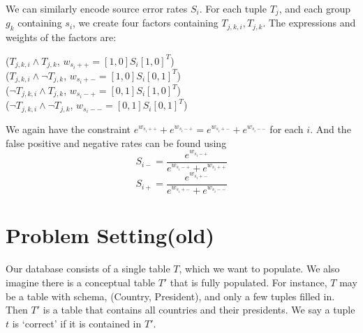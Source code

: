 \documentclass{sig-alternate}
\newcounter{prob}
\begin{document}
We can similarly encode source error rates $S_i$. For each tuple $T_j$, and each group $g_k$ containing $s_i$, we create four factors containing $T_{j,k,i}, T_{j,k}$. The expressions and weights of the factors are:

\noindent
($T_{j,k,i} \land T_{j,k}$, $w_{s_i++} = [1,0]S_i[1,0]^T$)\\ 
($T_{j,k,i} \land \lnot T_{j,k}$, $w_{s_i+-} = [1,0]S_i[0,1]^T$)\\
($\lnot T_{j,k,i} \land T_{j,k}$, $w_{s_i-+} = [0,1]S_i[1,0]^T$)\\ 
($\lnot T_{j,k,i} \land \lnot T_{j,k}$, $w_{s_i--} = [0,1]S_i[0,1]^T$)

We again have the constraint $e^{w_{s_i++}} + e^{w_{s_i-+}} = e^{w_{s_i+-}} + e^{w_{s_i--}}$ for each $i$. And the false positive and negative rates can be found using 
$$S_{i-} = \frac{e^{w_{s_i-+}}}{e^{w_{s_i-+}} + e^{w_{s_i++}}}$$ 
$$S_{i+} = \frac{e^{w_{s_i+-}}}{e^{w_{s_i+-}} + e^{w_{s_i--}}}$$






\section{Problem Setting(old)}
Our database consists of a single table $T$, which we want to populate. We also imagine there is a conceptual table $T'$ that is fully populated. For instance, $T$ may be a table with schema, (Country, President), and only a few tuples filled in. Then $T'$ is a table that contains all countries and their presidents. We say a tuple $t$ is `correct' if it is contained in $T'$. 
\end{document}
